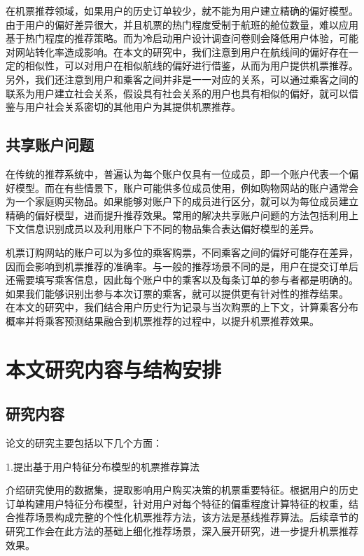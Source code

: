 在机票推荐领域，如果用户的历史订单较少，就不能为用户建立精确的偏好模型。由于用户的偏好差异很大，并且机票的热门程度受制于航班的舱位数量，难以应用基于热门程度的推荐策略。而为冷启动用户设计调查问卷则会降低用户体验，可能对网站转化率造成影响。在本文的研究中，我们注意到用户在航线间的偏好存在一定的相似性，可以对用户在相似航线的偏好进行借鉴，从而为用户提供机票推荐。另外，我们还注意到用户和乘客之间并非是一一对应的关系，可以通过乘客之间的联系为用户建立社会关系\cite{sedhain2014social}，假设具有社会关系的用户也具有相似的偏好，就可以借鉴与用户社会关系密切的其他用户为其提供机票推荐。

\subsection{共享账户问题}

在传统的推荐系统中，普遍认为每个账户仅具有一位成员，即一个账户代表一个偏好模型\cite{kabutoya2010modeling}。而在有些情景下，账户可能供多位成员使用，例如购物网站的账户通常会为一个家庭购买物品。如果能够对账户下的成员进行区分，就可以为每位成员建立精确的偏好模型，进而提升推荐效果。常用的解决共享账户问题的方法包括利用上下文信息识别成员\cite{adomavicius2011context}以及利用账户下不同的物品集合\cite{verstrepen2015top}表达偏好模型的差异。

机票订购网站的账户可以为多位的乘客购票，不同乘客之间的偏好可能存在差异，因而会影响到机票推荐的准确率。与一般的推荐场景不同的是，用户在提交订单后还需要填写乘客信息，因此每个账户中的乘客以及每条订单的参与者都是明确的。如果我们能够识别出参与本次订票的乘客，就可以提供更有针对性的推荐结果。
在本文的研究中，我们结合用户历史行为记录与当次购票的上下文，计算乘客分布概率并将乘客预测结果融合到机票推荐的过程中，以提升机票推荐效果。


\section{本文研究内容与结构安排}
\subsection{研究内容}
论文的研究主要包括以下几个方面：

1.提出基于用户特征分布模型的机票推荐算法

介绍研究使用的数据集，提取影响用户购买决策的机票重要特征。根据用户的历史订单构建用户特征分布模型，针对用户对每个特征的偏重程度计算特征的权重，结合推荐场景构成完整的个性化机票推荐方法，该方法是基线推荐算法。后续章节的研究工作会在此方法的基础上细化推荐场景，深入展开研究，进一步提升机票推荐效果。

